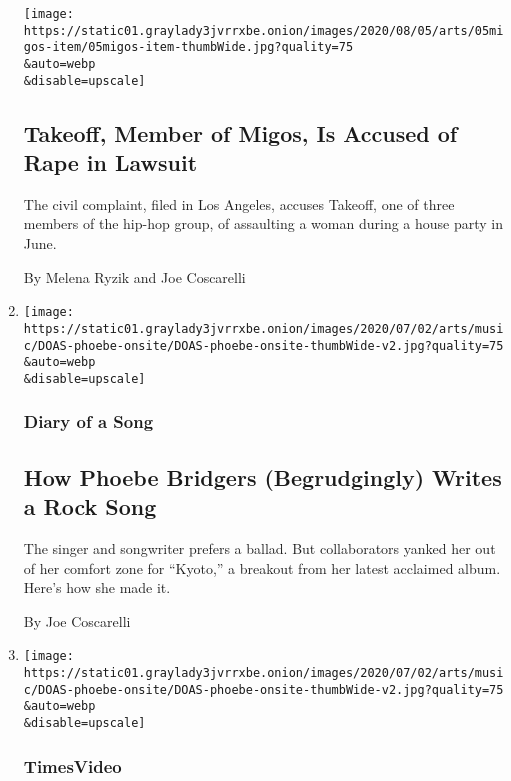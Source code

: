 \begin{enumerate}
  \texttt{[image: https://static01.graylady3jvrrxbe.onion/images/2020/08/05/arts/05migos-item/05migos-item-thumbWide.jpg?quality=75\\\&auto=webp\\\&disable=upscale]}

  \hypertarget{takeoff-member-of-migos-is-accused-of-rape-in-lawsuit}{%
  \subsection{Takeoff, Member of Migos, Is Accused of Rape in
  Lawsuit}\label{takeoff-member-of-migos-is-accused-of-rape-in-lawsuit}}

  The civil complaint, filed in Los Angeles, accuses Takeoff, one of
  three members of the hip-hop group, of assaulting a woman during a
  house party in June.

  By Melena Ryzik and Joe Coscarelli
\item
  \href{/2020/07/30/arts/music/phoebe-bridgers-kyoto.html}{}

  \texttt{[image: https://static01.graylady3jvrrxbe.onion/images/2020/07/02/arts/music/DOAS-phoebe-onsite/DOAS-phoebe-onsite-thumbWide-v2.jpg?quality=75\\\&auto=webp\\\&disable=upscale]}

  \hypertarget{diary-of-a-song}{%
  \subsubsection{Diary of a Song}\label{diary-of-a-song}}

  \hypertarget{how-phoebe-bridgers-begrudgingly-writes-a-rock-song}{%
  \subsection{How Phoebe Bridgers (Begrudgingly) Writes a Rock
  Song}\label{how-phoebe-bridgers-begrudgingly-writes-a-rock-song}}

  The singer and songwriter prefers a ballad. But collaborators yanked
  her out of her comfort zone for ``Kyoto,'' a breakout from her latest
  acclaimed album. Here's how she made it.

  By Joe Coscarelli
\item
  \href{/video/arts/music/100000007258359/phoebe-bridgers-kyoto.html}{}

  \texttt{[image: https://static01.graylady3jvrrxbe.onion/images/2020/07/02/arts/music/DOAS-phoebe-onsite/DOAS-phoebe-onsite-thumbWide-v2.jpg?quality=75\\\&auto=webp\\\&disable=upscale]}

  \hypertarget{timesvideo}{%
  \subsubsection{TimesVideo}\label{timesvideo}}


\end{enumerate}
